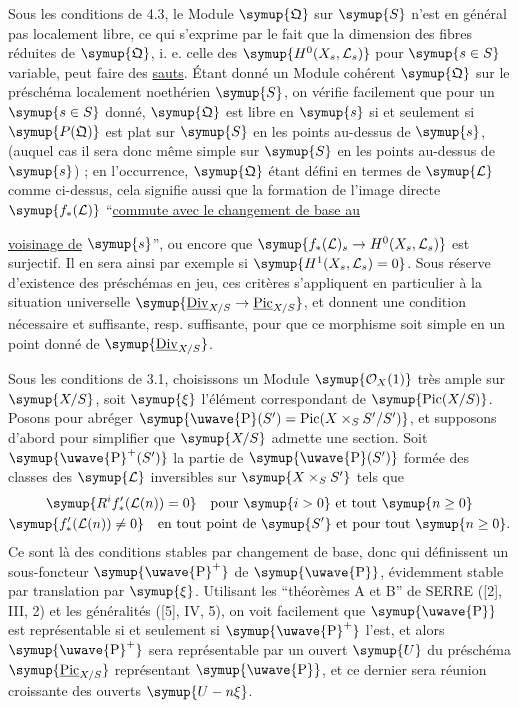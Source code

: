  Sous les conditions de 4.3, le Module $\symup{\mathfrak Q}$ sur
$\symup{S}$ n'est en général pas localement libre, ce qui s'exprime par le fait que la
dimension des fibres réduites de $\symup{\mathfrak Q}$, i. e. celle des
$\symup{H^0(X_s,\mathcal L_s)}$ pour $\symup{s\in S}$ variable, peut faire des \uline{sauts}. Étant
donné un Module cohérent $\symup{\mathfrak Q}$ sur le préschéma localement noethérien
$\symup{S}$, on vérifie facilement que pour un $\symup{s\in S}$ donné, $\symup{\mathfrak Q}$ est libre
en $\symup{s}$ si et seulement si $\symup{P(\mathfrak Q)}$ est plat sur $\symup{S}$ en les
points au-dessus de $\symup{s}$, (auquel cas il sera donc même simple sur $\symup{S}$ en les
points au-dessus de $\symup{s}$) ; en l'occurrence, $\symup{\mathfrak Q}$ étant défini en termes
de $\symup{\mathcal L}$ comme ci-dessus, cela signifie aussi que la formation de
l'image directe $\symup{f_*(\mathcal L)}$ ``\uline{commute avec le changement de base au}

\uline{voisinage de} $\symup{s}$'', ou encore que
$\symup{f_*(\mathcal L)_s\to H^0(X_s,\mathcal L_s)}$ est surjectif. Il en
sera ainsi par exemple si $\symup{H^1(X_s,\mathcal L_s)=0}$. Sous réserve d'existence
des préschémas en jeu, ces critères s'appliquent en particulier à la situation
universelle $\symup{\underline{\operatorname{Div}}_{X/S}\to\underline{\operatorname{Pic}}_{X/S}}$,
et donnent une condition nécessaire et suffisante, resp. suffisante, pour que
ce morphisme soit simple en un point donné de $\symup{\underline{\operatorname{Div}}_{X/S}}$.


Sous les conditions de 3.1, choisissons un Module $\symup{\mathcal O_X(1)}$ très ample
sur $\symup{X/S}$, soit $\symup{\xi}$ l'élément correspondant de
$\symup{\operatorname{Pic}(X/S)}$. Posons pour abréger
$\symup{\text{\uwave{P}}(S')=\operatorname{Pic}(X\times_SS'/S')}$, et supposons d'abord pour simplifier que $\symup{X/S}$ admette une section. Soit
$\symup{\text{\uwave{P}}^+(S')}$ la partie de $\symup{\text{\uwave{P}}(S')}$ formée des classes des $\symup{\mathcal L}$ inversibles
sur $\symup{X\times_SS'}$ tels que
\[
\begin{gathered}
\symup{R^if'_*(\mathcal L(n))=0}\quad\text{pour $\symup{i>0}$ et tout $\symup{n\geq0}$}\\
\symup{f'_*(\mathcal L(n))\neq0}\quad\text{en tout point de $\symup{S'}$ et pour tout $\symup{n\geq0}$}.
\end{gathered}
\]
Ce sont là des conditions stables par changement de base, donc qui définissent
un sous-foncteur $\symup{\text{\uwave{P}}^+}$ de $\symup{\text{\uwave{P}}}$, évidemment stable par translation par $\symup{\xi}$.
Utilisant les ``théorèmes A et B'' de SERRE ([2], III, 2) et les généralités
([5], IV, 5), on voit facilement que $\symup{\text{\uwave{P}}}$ est représentable si et seulement si
$\symup{\text{\uwave{P}}^+}$ l'est, et alors $\symup{\text{\uwave{P}}^+}$ sera représentable par un ouvert $\symup{U}$ du préschéma
$\symup{\underline{\operatorname{Pic}}_{X/S}}$ représentant $\symup{\text{\uwave{P}}}$, et ce dernier sera réunion
croissante des ouverts $\symup{U-n\xi}$.


